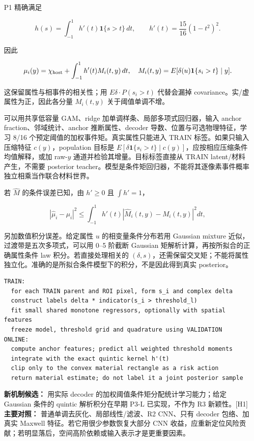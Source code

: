 \documentclass[
  11pt,
  a4paper,
]{article}
\begin{document}
P1 精确满足

\[h(s)=\int_{-1}^{1}h'(t)\mathbf1\{s>t\}\,dt,
\qquad h'(t)=\frac{15}{16}(1-t^2)^2.\]

因此

\[\mu_i(y)=\chi_{\rm host}+\int_{-1}^{1}h'(t)M_i(t,y)\,dt,
\quad M_i(t,y)=E[\delta(u)\mathbf1\{s_i>t\}\mid y].\]

这保留属性与相事件的相关性；用 \(E\delta\cdot P(s_i>t)\) 代替会漏掉
covariance。实/虚属性为正，因此各分量 \(M_i(t,y)\) 关于阈值单调不增。

可以用共享低容量 GAM、ridge 加单调样条、局部多项式回归器，输入 anchor
fraction、邻域统计、anchor 推断属性、decoder
导数、位置与可选物理特征，学习 8/16
个预定阈值的加权事件矩。真实属性只能进入 TRAIN 标签。如果只输入压缩特征
\(c(y)\)，population 目标是
\(E[\delta\mathbf1\{s_i>t\}\mid c(y)]\)，应按相应压缩条件均值解释，或加
raw-\(y\) 通道并检验其增量。目标标签直接从 TRAIN latent/材料产生，不需要
posterior
teacher。模型是条件矩回归器，不能将其逐像素事件概率独立相乘当作联合材料世界。

若 \(\widehat M\) 的条件误差已知，由 \(h'\ge0\) 且 \(\int h'=1\)，

\[|\widehat\mu_i-\mu_i|^2\le\int_{-1}^{1}h'(t)|\widehat M_i(t,y)-M_i(t,y)|^2dt,\]

另加数值积分误差。给定属性 \(u\) 的相变量条件分布若用 Gaussian mixture
近似，过渡带是五次多项式，可以用 0--5 阶截断 Gaussian
矩解析计算，再按所拟合的正确属性条件 law 积分。若直接处理相关的
\((\delta,s)\)，还需保留交叉矩；不能将属性独立化。准确的是所拟合条件模型下的积分，不是因此得到真实
posterior。

\begin{verbatim}
TRAIN:
  for each TRAIN parent and ROI pixel, form s_i and complex delta
  construct labels delta * indicator(s_i > threshold_l)
  fit small shared monotone regressors, optionally with spatial features
  freeze model, threshold grid and quadrature using VALIDATION
ONLINE:
  compute anchor features; predict all weighted threshold moments
  integrate with the exact quintic kernel h'(t)
  clip only to the convex material rectangle as a risk action
  return material estimate; do not label it a joint posterior sample
\end{verbatim}

\textbf{新机制候选：} 用实际 decoder
的加权阈值条件矩分配统计学习能力；给定 Gaussian 条件的 quintic
解析积分在早期 P3-L 已实现，不作为 R3 新颖性。{[}H1{]}
\textbf{主要对照：} 普通单调去灰化、局部线性/滤波、R2 CNN、只有 decoder
包络、加真实 Maxwell 特征。若它用很少参数恢复大部分 CNN
收益，应重新定位风险贡献；若明显落后，空间高阶依赖或输入表示才是更重要因素。
\end{document}
